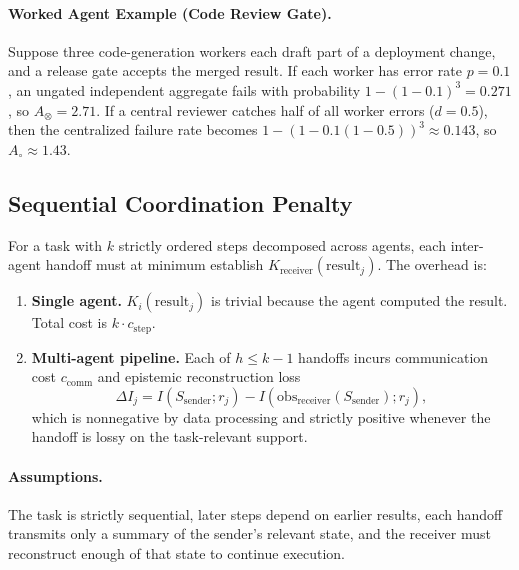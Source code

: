 \paragraph{Worked Agent Example (Code Review Gate).}
Suppose three code-generation workers each draft part of a deployment change, and a release gate accepts
the merged result. If each worker has error rate $p=0.1$, an ungated independent aggregate fails with
probability $1-(1-0.1)^3 = 0.271$, so $A_{\otimes}=2.71$. If a central reviewer catches half of all
worker errors ($d=0.5$), then the centralized failure rate becomes
$1-(1-0.1(1-0.5))^3 \approx 0.143$, so $A_{\circ}\approx 1.43$.

\subsection{Sequential Coordination Penalty}

\begin{theorem}
\label{thm:sequential-penalty}
For a task with $k$ strictly ordered steps decomposed across agents, each inter-agent handoff must at
minimum establish $K_{\mathrm{receiver}}(\mathrm{result}_j)$. The overhead is:
\begin{enumerate}[leftmargin=*]
\item[(a)] \textbf{Single agent.} $K_i(\mathrm{result}_j)$ is trivial because the agent computed the result.
Total cost is $k \cdot c_{\mathrm{step}}$.
\item[(b)] \textbf{Multi-agent pipeline.} Each of $h \le k-1$ handoffs incurs communication cost
$c_{\mathrm{comm}}$ and epistemic reconstruction loss
\begin{equation}
\Delta I_j = I(S_{\mathrm{sender}}; r_j) - I(\mathrm{obs}_{\mathrm{receiver}}(S_{\mathrm{sender}}); r_j),
\label{eq:epistemic-reconstruction-loss}
\end{equation}
which is nonnegative by data processing and strictly positive whenever the handoff is lossy on the
task-relevant support.
\end{enumerate}
\end{theorem}

\paragraph{Assumptions.}
The task is strictly sequential, later steps depend on earlier results, each handoff transmits only a
summary of the sender's relevant state, and the receiver must reconstruct enough of that state to
continue execution.

